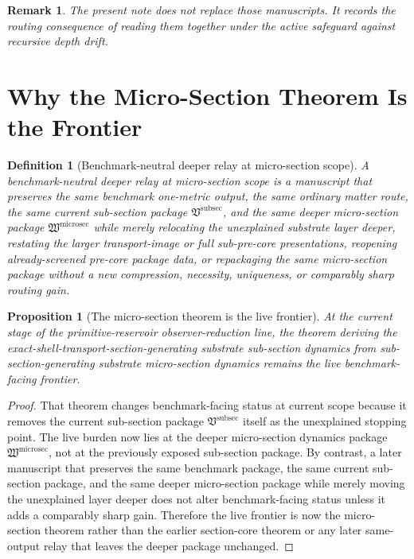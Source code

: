 \documentclass[11pt]{article}
\newcommand{\SubSectionPackage}{\mathfrak V^{\mathrm{subsec}}}
\newcommand{\MicroSectionPackage}{\mathfrak W^{\mathrm{microsec}}}
\newtheorem{definition}{Definition}
\newtheorem{proposition}{Proposition}
\newtheorem{remark}{Remark}
\begin{document}
\begin{remark}
The present note does not replace those manuscripts. It records the routing consequence of reading them together under the active safeguard against recursive depth drift.
\end{remark}

\section{Why the Micro-Section Theorem Is the Frontier}

\begin{definition}[Benchmark-neutral deeper relay at micro-section scope]
A \emph{benchmark-neutral deeper relay at micro-section scope} is a manuscript that preserves the same benchmark one-metric output, the same ordinary matter route, the same current sub-section package \(\SubSectionPackage\), and the same deeper micro-section package \(\MicroSectionPackage\) while merely relocating the unexplained substrate layer deeper, restating the larger transport-image or full sub-pre-core presentations, reopening already-screened pre-core package data, or repackaging the same micro-section package without a new compression, necessity, uniqueness, or comparably sharp routing gain.
\end{definition}

\begin{proposition}[The micro-section theorem is the live frontier]
At the current stage of the primitive-reservoir observer-reduction line, the theorem deriving the exact-shell-transport-section-generating substrate sub-section dynamics from sub-section-generating substrate micro-section dynamics remains the live benchmark-facing frontier.
\end{proposition}

\begin{proof}
That theorem changes benchmark-facing status at current scope because it removes the current sub-section package \(\SubSectionPackage\) itself as the unexplained stopping point. The live burden now lies at the deeper micro-section dynamics package \(\MicroSectionPackage\), not at the previously exposed sub-section package. By contrast, a later manuscript that preserves the same benchmark package, the same current sub-section package, and the same deeper micro-section package while merely moving the unexplained layer deeper does not alter benchmark-facing status unless it adds a comparably sharp gain. Therefore the live frontier is now the micro-section theorem rather than the earlier section-core theorem or any later same-output relay that leaves the deeper package unchanged.
\end{proof}
\end{document}
